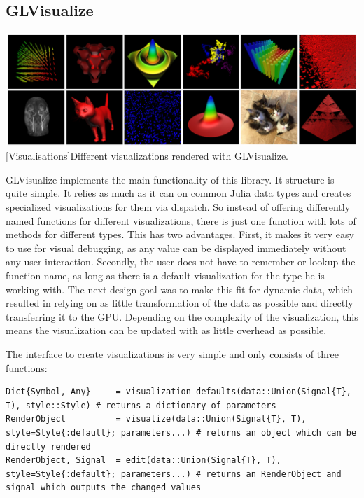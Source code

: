 \subsection{GLVisualize}

\vspace{1em}
\begin{minipage}{\linewidth}
    \centering
    \includegraphics[width=0.9\linewidth]{graphics/glvisualize.jpg}
    [Visualisations]{Different visualizations rendered with GLVisualize.}
    \label{fig:glvisualize}
\end{minipage}

GLVisualize implements the main functionality of this library.
It structure is quite simple. 
It relies as much as it can on common Julia data types and creates specialized visualizations for them via dispatch.
So instead of offering differently named functions for different visualizations, there is just one function with lots of methods for different types.
This has two advantages.
First, it makes it very easy to use for visual debugging, as any value can be displayed immediately without any user interaction.
Secondly, the user does not have to remember or lookup the function name, as long as there is a default visualization for the type he is working with.
The next design goal was to make this fit for dynamic data, which resulted in relying on as little transformation of the data as possible and directly transferring it to the GPU.
Depending on the complexity of the visualization, this means the visualization can be updated with as little overhead as possible.

The interface to create visualizations is very simple and only consists of three functions:
\begin{lstlisting}
Dict{Symbol, Any}     = visualization_defaults(data::Union(Signal{T}, T), style::Style) # returns a dictionary of parameters
RenderObject 		  = visualize(data::Union(Signal{T}, T), style=Style{:default}; parameters...) # returns an object which can be directly rendered
RenderObject, Signal  = edit(data::Union(Signal{T}, T), style=Style{:default}; parameters...) # returns an RenderObject and signal which outputs the changed values

\end{lstlisting}

